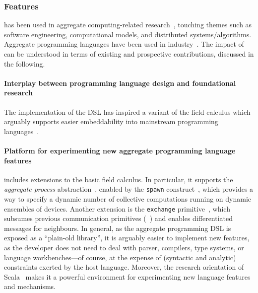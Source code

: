 \subsubsection{Features}
\label{s:impact}
\scafi{}
 has been used 
 in aggregate computing-related research~\cite{DBLP:journals/eaai/CasadeiVAPD21,audrito2022ecoop-xc,DBLP:conf/coordination/AguzziCV22,
 DBLP:conf/fmec/CasadeiV19,DBLP:conf/IEEEscc/CasadeiTVD19,DBLP:journals/scp/CasadeiAV18,DBLP:journals/jsan/CasadeiAV21,DBLP:conf/coordination/CasadeiVRA21,casadei2022applsci,arxiv2020scafi-nc},
  touching themes such as 
  software engineering, 
  computational models, and
  distributed systems/algorithms.
%
Aggregate programming languages 
 have been used in industry~\cite{DBLP:conf/saso/PaulosDBMHBPSSS19,DBLP:journals/taas/BealULRM18}.
%
The impact of \scafi{}
 can be understood in terms of 
 existing and prospective contributions, 
 discussed in the following.

\paragraph*{Interplay between programming language design and foundational research} 
%
The implementation of the \scafi{} DSL
 has inspired a variant of the field calculus
 which arguably supports easier embeddability
 into mainstream programming languages~\cite{DBLP:conf/isola/CasadeiVAD20,arxiv2020scafi-nc}.

\paragraph*{Platform for experimenting new aggregate programming language features}
%
\scafi{} includes extensions to the basic field calculus.
%
In particular, it supports the \emph{aggregate process} abstraction~\cite{DBLP:journals/eaai/CasadeiVAPD21}, enabled by the \texttt{spawn} construct~\cite{DBLP:conf/coordination/CasadeiVAPD19}, 
which provides a way to specify a dynamic number of collective computations running on dynamic ensembles of devices.
%
Another extension is the \texttt{exchange} primitive~\cite{audrito2022ecoop-xc,zenodo-xc-scala}, which subsumes previous communication primitives (~\cite{DBLP:journals/tocl/AudritoVDPB19}) and enables differentiated messages for neighbours.
%
In general, 
 as the aggregate programming DSL is exposed as a ``plain-old library'', 
 it is arguably easier to implement new features,
 as the developer does not need to deal 
 with parser, compilers, type systems, or language workbenches---of course, at the expense of (syntactic and analytic) constraints exerted by the host language.
%
Moreover, the research orientation of Scala~\cite{Odersky04scala-overview} 
 makes it a powerful environment for experimenting new language features and mechanisms. 


